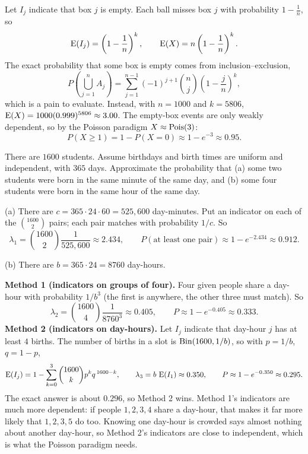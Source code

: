 \medskip

\begin{solution}
Let $I_j$ indicate that box $j$ is empty. Each ball misses box $j$ with probability $1 - \frac{1}{n}$, so
\medskip
\[
\operatorname{E}(I_j) = \left(1 - \frac{1}{n}\right)^{k},
\qquad
\operatorname{E}(X) = n\left(1 - \frac{1}{n}\right)^{k}.
\]
\medskip
The exact probability that some box is empty comes from inclusion--exclusion,
\medskip
\[
P\left(\bigcup_{j=1}^{n} A_j\right) = \sum_{j=1}^{n-1} (-1)^{j+1} \binom{n}{j} \left(1 - \frac{j}{n}\right)^{k},
\]
\medskip
which is a pain to evaluate. Instead, with $n = 1000$ and $k = 5806$, $\operatorname{E}(X) = 1000(0.999)^{5806} \approx 3.00$. The empty-box events are only weakly dependent, so by the Poisson paradigm $X \approx \operatorname{Pois}(3)$:
\medskip
\[
P(X \ge 1) = 1 - P(X = 0) \approx 1 - e^{-3} \approx 0.95.
\]
\end{solution}

\bigskip

\begin{example}\label{ex:birthminute}
There are $1600$ students. Assume birthdays and birth times are uniform and independent, with $365$ days. Approximate the probability that (a) some two students were born in the same minute of the same day, and (b) some four students were born in the same hour of the same day.
\end{example}

\medskip

\begin{solution}
(a) There are $c = 365 \cdot 24 \cdot 60 = 525{,}600$ day-minutes. Put an indicator on each of the $\binom{1600}{2}$ pairs; each pair matches with probability $1/c$. So
\medskip
\[
\lambda_1 = \binom{1600}{2} \frac{1}{525{,}600} \approx 2.434,
\qquad
P(\text{at least one pair}) \approx 1 - e^{-2.434} \approx 0.912.
\]
\bigskip

(b) There are $b = 365 \cdot 24 = 8760$ day-hours.

\medskip

\textbf{Method 1 (indicators on groups of four).} Four given people share a day-hour with probability $1/b^{3}$ (the first is anywhere, the other three must match). So
\medskip
\[
\lambda_2 = \binom{1600}{4} \frac{1}{8760^{3}} \approx 0.405,
\qquad
P \approx 1 - e^{-0.405} \approx 0.333.
\]
\medskip
\textbf{Method 2 (indicators on day-hours).} Let $I_j$ indicate that day-hour $j$ has at least $4$ births. The number of births in a slot is $\operatorname{Bin}(1600, 1/b)$, so with $p = 1/b$, $q = 1 - p$,
\medskip
\[
\operatorname{E}(I_j) = 1 - \sum_{k=0}^{3} \binom{1600}{k} p^{k} q^{\,1600-k},
\qquad
\lambda_3 = b\,\operatorname{E}(I_1) \approx 0.350,
\qquad
P \approx 1 - e^{-0.350} \approx 0.295.
\]
\medskip
The exact answer is about $0.296$, so Method 2 wins. Method 1's indicators are much more dependent: if people $1, 2, 3, 4$ share a day-hour, that makes it far more likely that $1, 2, 3, 5$ do too. Knowing one day-hour is crowded says almost nothing about another day-hour, so Method 2's indicators are close to independent, which is what the Poisson paradigm needs.
\end{solution}

